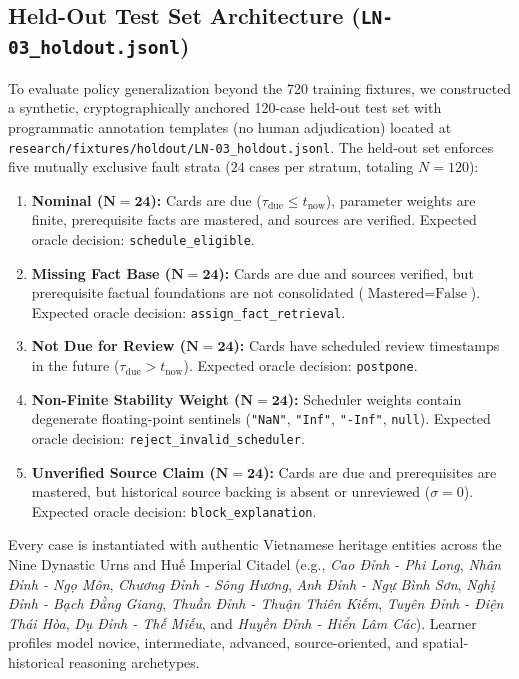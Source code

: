 \documentclass[11pt,a4paper]{article}
\begin{document}
\subsection{Held-Out Test Set Architecture (\texttt{LN-03\_holdout.jsonl})}
To evaluate policy generalization beyond the 720 training fixtures, we constructed a synthetic, cryptographically anchored 120-case held-out test set with programmatic annotation templates (no human adjudication) located at \texttt{research/fixtures/holdout/LN-03\_holdout.jsonl}. The held-out set enforces five mutually exclusive fault strata ($24$ cases per stratum, totaling $N=120$):
\begin{enumerate}[leftmargin=*]
    \item \textbf{Nominal ($\bm{N=24}$):} Cards are due ($\tau_{\text{due}} \le t_{\text{now}}$), parameter weights are finite, prerequisite facts are mastered, and sources are verified. Expected oracle decision: \texttt{schedule\_eligible}.
    \item \textbf{Missing Fact Base ($\bm{N=24}$):} Cards are due and sources verified, but prerequisite factual foundations are not consolidated ($\text{Mastered} = \text{False}$). Expected oracle decision: \texttt{assign\_fact\_retrieval}.
    \item \textbf{Not Due for Review ($\bm{N=24}$):} Cards have scheduled review timestamps in the future ($\tau_{\text{due}} > t_{\text{now}}$). Expected oracle decision: \texttt{postpone}.
    \item \textbf{Non-Finite Stability Weight ($\bm{N=24}$):} Scheduler weights contain degenerate floating-point sentinels (\texttt{"NaN"}, \texttt{"Inf"}, \texttt{"-Inf"}, \texttt{null}). Expected oracle decision: \texttt{reject\_invalid\_scheduler}.
    \item \textbf{Unverified Source Claim ($\bm{N=24}$):} Cards are due and prerequisites are mastered, but historical source backing is absent or unreviewed ($\sigma = 0$). Expected oracle decision: \texttt{block\_explanation}.
\end{enumerate}

Every case is instantiated with authentic Vietnamese heritage entities across the Nine Dynastic Urns and Huế Imperial Citadel (e.g., \textit{Cao Đỉnh - Phi Long}, \textit{Nhân Đỉnh - Ngọ Môn}, \textit{Chương Đỉnh - Sông Hương}, \textit{Anh Đỉnh - Ngự Bình Sơn}, \textit{Nghị Đỉnh - Bạch Đằng Giang}, \textit{Thuần Đỉnh - Thuận Thiên Kiếm}, \textit{Tuyên Đỉnh - Điện Thái Hòa}, \textit{Dụ Đỉnh - Thế Miếu}, and \textit{Huyền Đỉnh - Hiển Lâm Các}). Learner profiles model novice, intermediate, advanced, source-oriented, and spatial-historical reasoning archetypes.
\end{document}
